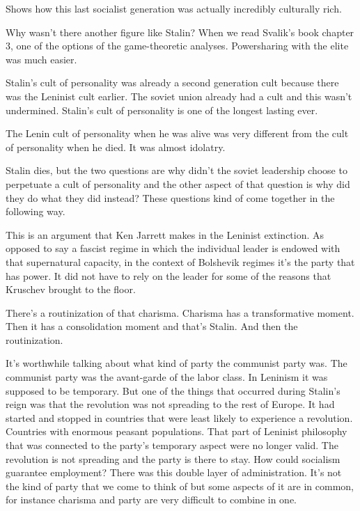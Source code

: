 \documentclass{article}
\begin{document}
Shows how this last socialist generation was actually incredibly culturally rich.  

\vspace{3mm}

Why wasn't there another figure like Stalin?  When we read Svalik's book chapter 3, one of the options of the game-theoretic analyses.  Powersharing with the elite was much easier.  

\vspace{3mm}

Stalin's cult of personality was already a second generation cult because there was the Leninist cult earlier.  The soviet union already had a cult and this wasn't undermined.  Stalin's cult of personality is one of the longest lasting ever.  

\vspace{3mm}

The Lenin cult of personality when he was alive was very different from the cult of personality when he died.  It was almost idolatry.  

\vspace{3mm}

Stalin dies, but the two questions are why didn't the soviet leadership choose to perpetuate a cult of personality and the other aspect of that question is why did they do what they did instead?  These questions kind of come together in the following way. 

\vspace{3mm}

This is an argument that Ken Jarrett makes in the Leninist extinction.  As opposed to say a fascist regime in which the individual leader is endowed with that supernatural capacity, in the context of Bolshevik regimes it's the party that has power.  It did not have to rely on the leader for some of the reasons that Kruschev brought to the floor.  

\vspace{3mm}

There's a routinization of that charisma.  Charisma has a transformative moment.  Then it has a consolidation moment and that's Stalin.  And then the routinization.  

\vspace{3mm}

It's worthwhile talking about what kind of party the communist party was.  The communist party was the avant-garde of the labor class.  In Leninism it was supposed to be temporary.  But one of the things that occurred during Stalin's reign was that the revolution was not spreading to the rest of Europe.  It had started and stopped in countries that were least likely to experience a revolution.  Countries with enormous peasant populations.  That part of Leninist philosophy that was connected to the party's temporary aspect were no longer valid.  The revolution is not spreading and the party is there to stay.  How could socialism guarantee employment?  There was this double layer of administration.  It's not the kind of party that we come to think of but some aspects of it are in common, for instance charisma and party are very difficult to combine in one.  
\end{document}
